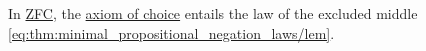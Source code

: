 \begin{theorem}\label{diaconescu_goodman_myhill_theorem}
  In \hyperref[def:set_zfc]{ZFC}, the \hyperref[def:set_zfc/A9]{axiom of choice} entails the law of the excluded middle \eqref{eq:thm:minimal_propositional_negation_laws/lem}.
\end{theorem}
